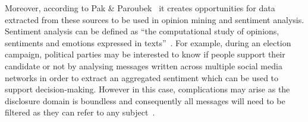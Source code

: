 Moreover, according to Pak \& Paroubek~\parencite{rep:LERC} it creates opportunities for data extracted from these sources to be used in opinion mining and sentiment analysis. Sentiment analysis can be defined as ``the computational study of opinions, sentiments and emotions expressed in texts''~\parencite{inbook:lang_proc_sec}.  For example, during an election campaign, political parties may be interested to know if people support their candidate or not by analysing messages written across multiple social media networks in order to extract an aggregated sentiment which can be used to support decision-making. However in this case, complications may arise as the disclosure domain is boundless and consequently all messages will need to be filtered as they can refer to any subject~\parencite{art:computers_human_behaviour}.
